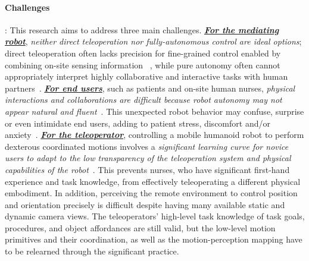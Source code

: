 \documentclass[letterpaper, 11 pt, onecolumn]{article}
\newcommand{\fig}[1]{Fig.~\ref{#1}}
\begin{document}
\paragraph*{Challenges}: This research aims to address three main challenges. \underline{\textbf{\textit{For the mediating robot}}}, {\it neither direct teleoperation nor fully-autonomous control are ideal options}; direct teleoperation often lacks precision for fine-grained control enabled by combining on-site sensing information ~\cite{chen2007human,chen2011supervisory}, while pure autonomy often cannot appropriately interpret highly collaborative and interactive tasks with human partners~\cite{beer2014toward,nahavandi2017trusted,alaieri2016ethical}. \underline{\textbf{\textit{For end users}}}, such as patients and on-site human nurses, {\it physical interactions and collaborations are difficult because robot autonomy may not appear natural and fluent}~\cite{goetz2003matching,strabala2013towards, mitsunaga2008adapting}. This unexpected robot behavior may confuse, surprise or even intimidate end users, adding to patient stress, discomfort and/or anxiety~\cite{nomura2008prediction}. \underline{\textbf{\textit{For the teleoperator}}}, controlling a mobile humanoid robot to perform dexterous coordinated motions involves a {\it significant learning curve for novice users to adapt to the low transparency of the teleoperation system and physical capabilities of the robot}~\cite{rosen2002task,ballantyne2002robotic,novick2003analysis,sudan2012multifactorial,sng2013multiphasic}. This prevents nurses, who have significant first-hand experience and task knowledge, from effectively teleoperating a different physical embodiment.
In addition, perceiving the remote environment to control position and orientation precisely is difficult despite having many available static and dynamic camera views. The teleoperators' high-level task knowledge of task goals, procedures, and object affordances are still valid, but the low-level motion primitives and their coordination,  as well as the motion-perception mapping have to be relearned through the significant practice. 




\end{document}
